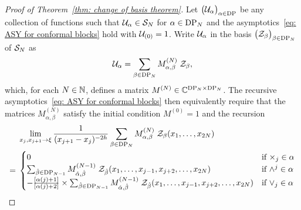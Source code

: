 \documentclass[oneside,english]{amsart}
\numberwithin{equation}{section}
\numberwithin{figure}{section}
\theoremstyle{plain}
\theoremstyle{plain}
\theoremstyle{plain}
\theoremstyle{remark}
\theoremstyle{plain}
\theoremstyle{plain}
\theoremstyle{plain}
\theoremstyle{plain}
\theoremstyle{plain}
\theoremstyle{plain}
\theoremstyle{plain}
\theoremstyle{plain}
\newcommand{\blue}[1]{{\color{blue} #1}}
\begin{document}
\begin{proof}[Proof of Theorem~\ref{thm: change of basis theorem}]
Let $\big( \mathcal{U}_\alpha \big)_{\alpha \in \mathrm{DP}}$ be any collection of functions such that
$\mathcal{U}_\alpha \in \mathcal{S}_N$ for $\alpha \in \mathrm{DP}_N$
and the asymptotics~\eqref{eq: ASY for conformal blocks} hold with $\mathcal{U}_{(0)} = 1$.
Write $\mathcal{U}_\alpha$ in the basis $\big( \mathcal{Z}_\beta \big)_{\beta \in \mathrm{DP}_N}$ of $\mathcal{S}_N$ as
\begin{align*}
\mathcal{U}_\alpha = \sum_{\beta \in \mathrm{DP}_N} M^{(N)}_{\alpha, \beta} \; \mathcal{Z}_\beta ,
\end{align*}
which, for each $N \in \mathbb{N}$, defines a matrix $M^{(N)} \in \mathbb{C}^{\mathrm{DP}_N \times \mathrm{DP}_N}$.
The %
recursive asymptotics~\eqref{eq: ASY for conformal blocks} then
equivalently require that the matrices $M^{(N)}_{\alpha, \beta}$ satisfy the initial condition $M^{(0)}=1$ and the recursion
\begin{align}
\begin{split}
& \lim_{x_j , x_{j+1} \to \xi} \frac{1}{(x_{j+1} - x_j)^{-2h}}
    \sum_{\beta \in \mathrm{DP}_N} M^{(N)}_{\alpha, \beta} \; \mathcal{Z}_\beta (x_1 , \ldots, x_{2N}) \\
= \; & \begin{cases} 
0 & \text{if } \times_j \in \alpha \\
\label{eq: coblo walk projection conditions 2}
 \sum_{\hat{\beta} \in \mathrm{DP}_{N-1}} M^{(N-1)}_{\hat{\alpha}, \hat{\beta} } \; \mathcal{Z}_{ \hat{\beta} } (x_1 , \ldots, x_{j-1} , x_{j+2}, \ldots, x_{2N})
& \text{if } \wedge^j \in \alpha \\
- \frac{\left[\alpha(j)+1\right]}{\left[\alpha(j)+2\right]} \times
 \sum_{\hat{\beta} \in \mathrm{DP}_{N-1}} M^{(N-1)}_{\hat{\alpha}, \hat{\beta} } \; \mathcal{Z}_{ \hat{\beta} } (x_1 , \ldots, x_{j-1} , x_{j+2}, \ldots, x_{2N})
& \text{if } \vee_j \in \alpha
\end{cases}
\end{split}
\end{align}

\end{proof}
\end{document}
